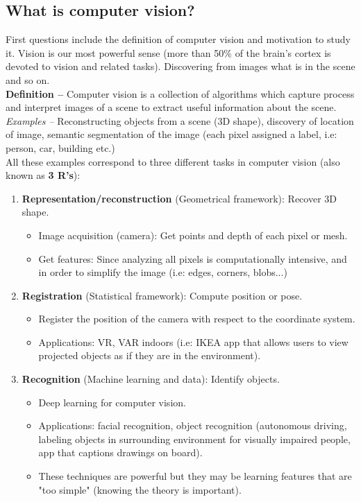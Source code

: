 \documentclass[a4paper,11pt]{article}
\begin{document}
\subsection{What is computer vision?}
First questions include the definition of computer vision and motivation to study it. Vision is our most powerful sense (more than 50\% of the brain's cortex is devoted to vision and related tasks). Discovering from images what is in the scene and so on.
\vspace{5pt}
\\
\textbf{Definition --} Computer vision is a collection of algorithms which capture process and interpret images of a scene to extract useful information about the scene.
\vspace{5pt}
\\
\textit{Examples --} Reconstructing objects from a scene (3D shape), discovery of location of image, semantic segmentation of the image (each pixel assigned a label, i.e: person, car, building etc.)\vspace{5pt}\\
All these examples correspond to three different tasks in computer vision (also known as \textbf{3 R's}):
\begin{enumerate}
	\item \textbf{Representation/reconstruction} (Geometrical framework): Recover 3D shape.
	\begin{itemize}
		\item Image acquisition (camera): Get points and depth of each pixel or mesh.
		\item Get features: Since analyzing all pixels is computationally intensive, and in order to simplify the image (i.e: edges, corners, blobs...)
	\end{itemize}
	\item \textbf{Registration} (Statistical framework): Compute position or pose.
	\begin{itemize}
		\item Register the position of the camera with respect to the coordinate system.
		\item Applications: VR, VAR indoors (i.e: IKEA app that allows users to view projected objects as if they are in the environment).
	\end{itemize}
	\item \textbf{Recognition} (Machine learning and data): Identify objects.
	\begin{itemize}
		\item Deep learning for computer vision.
		\item Applications: facial recognition, object recognition (autonomous driving, labeling objects in surrounding environment for visually impaired people, app that captions drawings on board).
		\item These techniques are powerful but they may be learning features that are "too simple" (knowing the theory is important).
	\end{itemize}
\end{enumerate}
\end{document}
